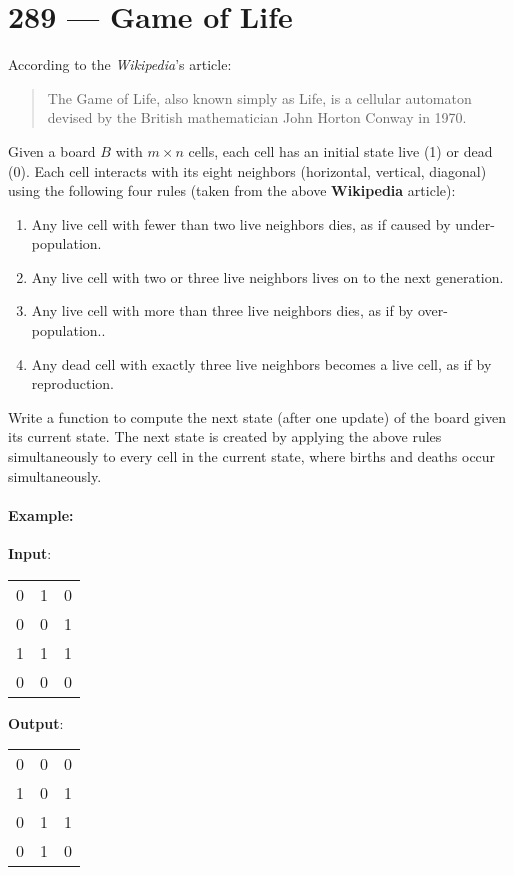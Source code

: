 \section{289 --- Game of Life}
According to the \textit{Wikipedia}'s article: 
\begin{quotation}
The Game of Life, also known simply as Life, is a cellular automaton devised by the British mathematician John Horton Conway in 1970.
\end{quotation}

Given a board $B$ with $m\times n$ cells, each cell has an initial state live (1) or dead (0). Each cell interacts with its eight neighbors (horizontal, vertical, diagonal) using the following four rules (taken from the above \textbf{Wikipedia} article):

\begin{enumerate}
\item Any live cell with fewer than two live neighbors dies, as if caused by under-population.
\item Any live cell with two or three live neighbors lives on to the next generation.
\item Any live cell with more than three live neighbors dies, as if by over-population..
\item Any dead cell with exactly three live neighbors becomes a live cell, as if by reproduction.
\end{enumerate}

Write a function to compute the next state (after one update) of the board given its current state. The next state is created by applying the above rules simultaneously to every cell in the current state, where births and deaths occur simultaneously.

\paragraph{Example:}

\begin{flushleft}
\textbf{Input}: 
\begin{table}[H]
\begin{tabular}{lll}
0 & 1 & 0\\
0 & 0 & 1\\
1 & 1 & 1\\
0 & 0 & 0
\end{tabular}
\end{table}

\textbf{Output}: 
\begin{table}[H]
\begin{tabular}{lll}
0 & 0 & 0\\
1 & 0 & 1\\
0 & 1 & 1\\
0 & 1 & 0
\end{tabular}
\end{table}
\end{flushleft}

